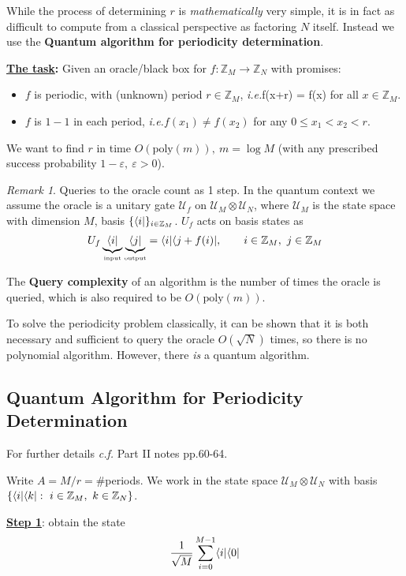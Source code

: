 \documentclass[]{article}
\DeclarePairedDelimiter\bra{\langle}{\rvert}
\theoremstyle{custhm}
\theoremstyle{cusdef}
\theoremstyle{custhm}
\theoremstyle{remark}
\newtheorem*{remark*}{Remark}
\newcommand{\Z}{\mathbb{Z}}
\newcommand{\ra}{\rightarrow}
\newcommand{\ie}{\textit{i.e.}}
\newcommand{\poly}{\textrm{poly}}
\newcommand{\eps}{\varepsilon}
\newcommand{\U}{\mathcal{U}}
\begin{document}
While the process of determining $r$ is \textit{mathematically} very simple, it is in fact as difficult to compute from a classical perspective as factoring $N$ itself. Instead we use the \textbf{Quantum algorithm for periodicity determination}.

\textbf{\underline{The task}:} Given an oracle/black box for $f:\Z_M \ra \Z_N$ with promises:
\begin{itemize}
	\item $f$ is periodic, with (unknown) period $r\in \Z_M$, \ie f(x+r) = f(x) for all $x\in \Z_M$.
	\item $f$ is $1-1$ in each period, \ie $f(x_1)\ne f(x_2)$ for any $0\le x_1 < x_2 < r$.
\end{itemize}

We want to find $r$ in time $O(\poly(m)),\ m = \log M$ (with any prescribed success probability $1-\eps,\ \eps > 0$).

\begin{remark*}
	Queries to the oracle count as 1 step. In the quantum context we assume the oracle is a unitary gate $\U_f$ on $\U_M\otimes \U_N$, where $\U_M$ is the state space with dimension $M$, basis $\{ \bra{i} \}_{i\in\Z_M}$. $U_f$ acts on basis states as
	\[
	U_f\underbrace{\bra{i}}_{\textrm{\tiny input}}\underbrace{\bra{j}}_{\textrm{\tiny output}} = \bra{i}\bra{j+f(i)},\qquad i\in\Z_M,\ j\in\Z_M
	\]
	
	The \textbf{Query complexity} of an algorithm is the number of times the oracle is queried, which is also required to be $O(\poly(m))$.
\end{remark*}

To solve the periodicity problem classically, it can be shown that it is both necessary and sufficient to query the oracle $O(\sqrt{N})$ times, so there is no polynomial algorithm. However, there \textit{is} a quantum algorithm.

\subsection{Quantum Algorithm for Periodicity Determination}

For further details \textit{c.f.} Part II notes pp.60-64.

Write $A = M/r = \#$periods. We work in the state space $\U_M\otimes\U_N$ with basis $\{\bra{i}\bra{k}:\ i\in\Z_M,\ k\in\Z_N\}$.

\underline{\textbf{Step 1}}: obtain the state \[ \frac{1}{\sqrt{M}} \sum_{i=0}^{M-1}\bra{i}\bra{0}\]
\end{document}
